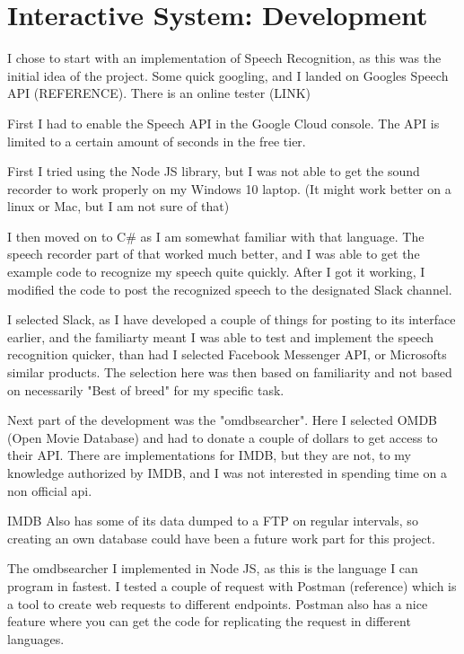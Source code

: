 \documentclass[11pt,fleqn]{book} %
\begin{document}

\chapter{Interactive System: Development}
I chose to start with an implementation of Speech Recognition, as this was the initial idea of the project.
Some quick googling, and I landed on Googles Speech API (REFERENCE). There is an online tester (LINK)

First I had to enable the Speech API in the Google Cloud console. The API is limited to a certain amount of seconds in the free tier.

First I tried using the Node JS library, but I was not able to get the sound recorder to work properly on my Windows 10 laptop. (It might work better on a linux or Mac, but I am not sure of that)

I then moved on to C\# as I am somewhat familiar with that language. The speech recorder part of that worked much better, and I was able to get the example code to recognize my speech quite quickly.
After I got it working, I modified the code to post the recognized speech to the designated Slack channel.

I selected Slack, as I have developed a couple of things for posting to its interface earlier, and the familiarty meant I was able to test and implement the speech recognition quicker, than had I selected Facebook Messenger API, or Microsofts similar products.
The selection here was then based on familiarity and not based on necessarily "Best of breed" for my specific task.

Next part of the development was the "omdbsearcher". Here I selected OMDB (Open Movie Database) and had to donate a couple of dollars to get access to their API. There are implementations for IMDB, but they are not, to my knowledge authorized by IMDB, and I was not interested in spending time on a non official api.

IMDB Also has some of its data dumped to a FTP on regular intervals, so creating an own database could have been a future work part for this project.

The omdbsearcher I implemented in Node JS, as this is the language I can program in fastest. I tested a couple of request with Postman (reference) which is a tool to create web requests to different endpoints. Postman also has a nice feature where you can get the code for replicating the request in different languages.
\end{document}

